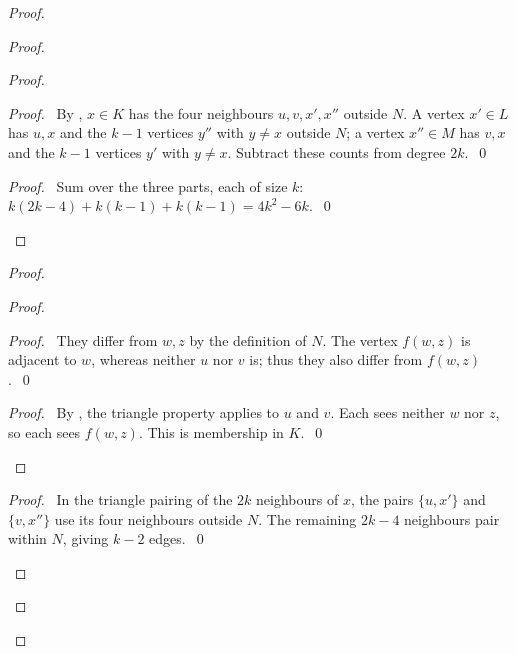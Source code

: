 \begin{proof}
 \begin{proof}
  \begin{proof}
   \begin{proof}
    \pf\ By , $x\in K$ has the four neighbours $u,v,x',x''$
    outside $N$. A vertex $x'\in L$ has $u,x$ and the $k-1$ vertices $y''$ with
    $y\ne x$ outside $N$; a vertex $x''\in M$ has $v,x$ and the $k-1$ vertices
    $y'$ with $y\ne x$. Subtract these counts from degree $2k$.~\qed
   \end{proof}
   \qedstep
   \begin{proof}
    \pf\ Sum  over the three parts, each of size $k$:
    $k(2k-4)+k(k-1)+k(k-1)=4k^2-6k$.~\qed
   \end{proof}
  \end{proof}
  \begin{proof}
   \begin{proof}
    \begin{proof}
     \pf\ They differ from $w,z$ by the definition of $N$.
     The vertex $f(w,z)$ is adjacent to $w$, whereas neither $u$ nor $v$ is;
     thus they also differ from $f(w,z)$.~\qed
    \end{proof}
    \qedstep
    \begin{proof}
     \pf\ By , the triangle property applies to $u$ and $v$.
     Each sees neither $w$ nor $z$, so each sees $f(w,z)$. This is membership in $K$.~\qed
    \end{proof}
   \end{proof}
   \begin{proof}
    \pf\ In the triangle pairing of the $2k$ neighbours of $x$, the pairs
    $\{u,x'\}$ and $\{v,x''\}$ use its four neighbours outside $N$.
    The remaining $2k-4$ neighbours pair within $N$, giving $k-2$ edges.~\qed
   \end{proof}

\end{proof}
\end{proof}
\end{proof}
